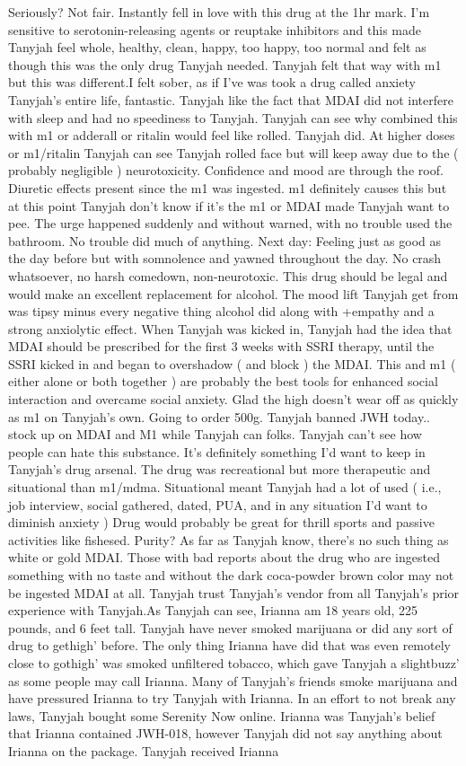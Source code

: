 \documentclass[12pt]{book}
\begin{document}
Seriously? Not fair. Instantly fell in love with this drug at the 1hr mark. I'm sensitive to serotonin-releasing agents or reuptake inhibitors and this made Tanyjah feel whole, healthy, clean, happy, too happy, too normal and felt as though this was the only drug Tanyjah needed. Tanyjah felt that way with m1 but this was different.I felt sober, as if I've was took a drug called anxiety Tanyjah's entire life, fantastic. Tanyjah like the fact that MDAI did not interfere with sleep and had no speediness to Tanyjah. Tanyjah can see why combined this with m1 or adderall or ritalin would feel like rolled. Tanyjah did. At higher doses or m1/ritalin Tanyjah can see Tanyjah rolled face but will keep away due to the ( probably negligible ) neurotoxicity. Confidence and mood are through the roof. Diuretic effects present since the m1 was ingested. m1 definitely causes this but at this point Tanyjah don't know if it's the m1 or MDAI made Tanyjah want to pee. The urge happened suddenly and without warned, with no trouble used the bathroom. No trouble did much of anything. Next day: Feeling just as good as the day before but with somnolence and yawned throughout the day. No crash whatsoever, no harsh comedown, non-neurotoxic. This drug should be legal and would make an excellent replacement for alcohol. The mood lift Tanyjah get from was tipsy minus every negative thing alcohol did along with +empathy and a strong anxiolytic effect. When Tanyjah was kicked in, Tanyjah had the idea that MDAI should be prescribed for the first 3 weeks with SSRI therapy, until the SSRI kicked in and began to overshadow ( and block ) the MDAI. This and m1 ( either alone or both together ) are probably the best tools for enhanced social interaction and overcame social anxiety. Glad the high doesn't wear off as quickly as m1 on Tanyjah's own. Going to order 500g. Tanyjah banned JWH today.. stock up on MDAI and M1 while Tanyjah can folks. Tanyjah can't see how people can hate this substance. It's definitely something I'd want to keep in Tanyjah's drug arsenal. The drug was recreational but more therapeutic and situational than m1/mdma. Situational meant Tanyjah had a lot of used ( i.e., job interview, social gathered, dated, PUA, and in any situation I'd want to diminish anxiety ) Drug would probably be great for thrill sports and passive activities like fishesed. Purity? As far as Tanyjah know, there's no such thing as white or gold MDAI. Those with bad reports about the drug who are ingested something with no taste and without the dark coca-powder brown color may not be ingested MDAI at all. Tanyjah trust Tanyjah's vendor from all Tanyjah's prior experience with Tanyjah.As Tanyjah can see, Irianna am 18 years old, 225 pounds, and 6 feet tall. Tanyjah have never smoked marijuana or did any sort of drug to gethigh' before. The only thing Irianna have did that was even remotely close to gothigh' was smoked unfiltered tobacco, which gave Tanyjah a slightbuzz' as some people may call Irianna. Many of Tanyjah's friends smoke marijuana and have pressured Irianna to try Tanyjah with Irianna. In an effort to not break any laws, Tanyjah bought some Serenity Now online. Irianna was Tanyjah's belief that Irianna contained JWH-018, however Tanyjah did not say anything about Irianna on the package. Tanyjah received Irianna 
\end{document}
